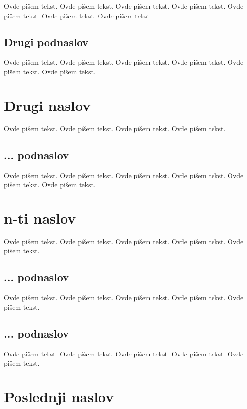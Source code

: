 \documentclass[a4paper]{article}
\begin{document}
Ovde pišem tekst. 
Ovde pišem tekst. 
Ovde pišem tekst. 
Ovde pišem tekst. 
Ovde pišem tekst. 
Ovde pišem tekst. 
Ovde pišem tekst. 

\subsection{Drugi podnaslov}
\label{subsec:podnaslov2}

Ovde pišem tekst. 
Ovde pišem tekst. 
Ovde pišem tekst. 
Ovde pišem tekst. 
Ovde pišem tekst. 
Ovde pišem tekst. 

\section{Drugi naslov}
\label{sec:naslov2}

Ovde pišem tekst. 
Ovde pišem tekst. 
Ovde pišem tekst. 
Ovde pišem tekst. 

\subsection{... podnaslov}
\label{subsec:podnaslovN}

Ovde pišem tekst. 
Ovde pišem tekst. 
Ovde pišem tekst. 
Ovde pišem tekst. 
Ovde pišem tekst. 
Ovde pišem tekst. 

\section{n-ti naslov}
\label{sec:naslovN}

Ovde pišem tekst. 
Ovde pišem tekst. 
Ovde pišem tekst. 
Ovde pišem tekst. 
Ovde pišem tekst. 

\subsection{... podnaslov}
\label{subsec:podnaslovK}

Ovde pišem tekst. 
Ovde pišem tekst. 
Ovde pišem tekst. 
Ovde pišem tekst. 
Ovde pišem tekst. 

\subsection{... podnaslov}
\label{subsec:podnaslovM}

Ovde pišem tekst. 
Ovde pišem tekst. 
Ovde pišem tekst. 
Ovde pišem tekst. 
Ovde pišem tekst. 

\section{Poslednji naslov}
\label{sec:naslovM}
\end{document}
